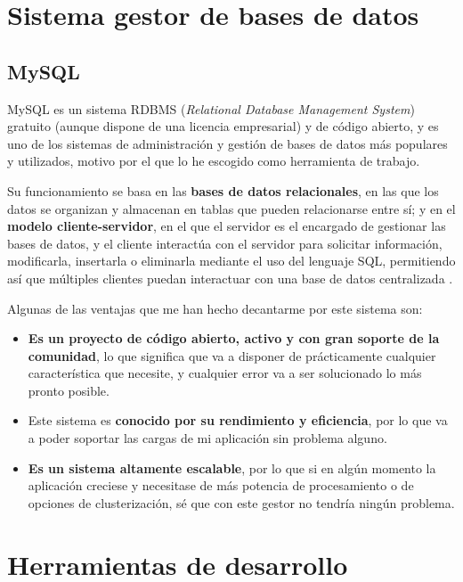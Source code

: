 \section{Sistema gestor de bases de datos}

\subsection{MySQL}

MySQL es un sistema RDBMS (\textit{Relational Database Management System}) gratuito (aunque dispone de una licencia empresarial) y de código abierto, y es uno de los sistemas de administración y gestión de bases de datos más populares y utilizados, motivo por el que lo he escogido como herramienta de trabajo.

Su funcionamiento se basa en las \textbf{bases de datos relacionales}, en las que los datos se organizan y almacenan en tablas que pueden relacionarse entre sí; y en el \textbf{modelo cliente-servidor}, en el que el servidor es el encargado de gestionar las bases de datos, y el cliente interactúa con el servidor para solicitar información, modificarla, insertarla o eliminarla mediante el uso del lenguaje SQL, permitiendo así que múltiples clientes puedan interactuar con una base de datos centralizada \cite{wikipedia:mysql}.

Algunas de las ventajas que me han hecho decantarme por este sistema son:

\begin{itemize}
  \item \textbf{Es un proyecto de código abierto, activo y con gran soporte de la comunidad}, lo que significa que va a disponer de prácticamente cualquier característica que necesite, y cualquier error va a ser solucionado lo más pronto posible.
  \item Este sistema es \textbf{conocido por su rendimiento y eficiencia}, por lo que va a poder soportar las cargas de mi aplicación sin problema alguno.
  \item \textbf{Es un sistema altamente escalable}, por lo que si en algún momento la aplicación creciese y necesitase de más potencia de procesamiento o de opciones de clusterización, sé que con este gestor no tendría ningún problema.
\end{itemize}


\section{Herramientas de desarrollo}

